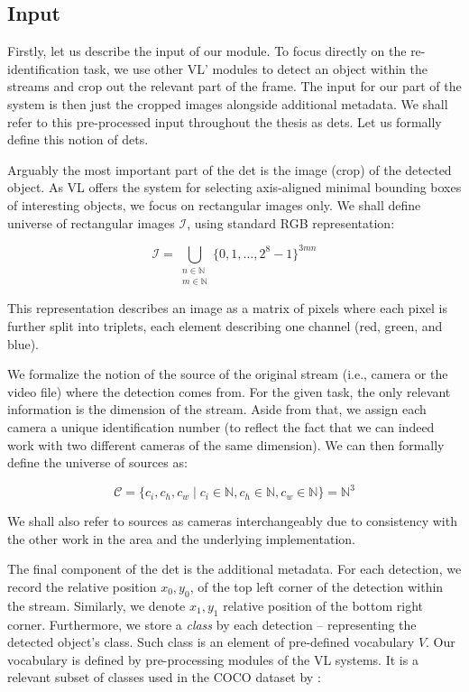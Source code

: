 \subsection{Input}

\label{ssec:input}

Firstly, let us describe the input of our module. To focus directly on the re-identification task, we use other \gls{VL}' modules to detect an object within the streams and crop out the relevant part of the frame. The input for our part of the system is then just the cropped images alongside additional metadata. We shall refer to this pre-processed input throughout the thesis as \glspl{det}. Let us formally define this notion of \glspl{det}.

Arguably the most important part of the \gls{det} is the image (crop) of the detected object. As \gls{VL} offers the system for selecting axis-aligned minimal bounding boxes of interesting objects, we focus on rectangular images only. We shall define universe of rectangular images $\mathcal{I}$, using standard RGB representation:

\begin{equation}
\mathcal{I} = \bigcup_{\substack{n \in \mathbb{N} \\ m \in \mathbb{N}}} \{0, 1, \ldots, 2^8-1\}^{3mn}
\label{eq:image}
\end{equation}


This representation describes an image as a matrix of pixels where each pixel is further split into triplets, each element describing one channel (red, green, and blue).

We formalize the notion of the source of the original stream (i.e., camera or the video file) where the detection comes from. For the given task, the only relevant information is the dimension of the stream. Aside from that, we assign each camera a unique identification number (to reflect the fact that we can indeed work with two different cameras of the same dimension). We can then formally define the universe of sources as:

$$\mathcal{C} = \{c_i, c_h, c_w \mid c_i \in \mathbb{N}, c_h \in \mathbb{N}, c_w \in \mathbb{N}\}
 = \mathbb{N}^3$$
 
We shall also refer to sources as cameras interchangeably due to consistency with the other work in the area and the underlying implementation.

The final component of the \gls{det} is the additional metadata. For each detection, we record the relative position $x_0, y_0$, of the top left corner of the detection within the stream. Similarly, we denote $x_1, y_1$ relative position of the bottom right corner. Furthermore, we store a \emph{class} by each detection -- representing the detected object's class. Such class is an element of pre-defined vocabulary $V$. Our vocabulary is defined by pre-processing modules of the \gls{VL} systems. It is a relevant subset of classes used in the COCO dataset by \cite{cocodataset}:


